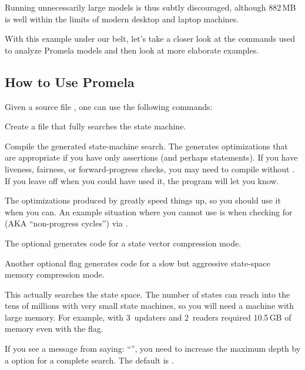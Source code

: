 Running unnecessarily large models is thus subtly discouraged, although
882\,MB is well within the limits of modern desktop and laptop machines.

With this example under our belt, let's take a closer look at the
commands used to analyze Promela models and then look at more
elaborate examples.

\subsection{How to Use Promela}
\label{sec:formal:How to Use Promela}

Given a source file , one can use the following commands:

\begin{description}[style=nextline]
\item	[\tco{spin -a qrcu.spin}]
	Create a file  that fully searches the state machine.
\item	[\tco{cc -DSAFETY [-DCOLLAPSE] [-DMA=N] -o pan pan.c}]
	Compile the generated state-machine search.
	The  generates optimizations that are appropriate
	if you have only assertions (and perhaps  statements).
	If you have liveness, fairness, or forward-progress checks,
	you may need to compile without .
	If you leave off  when you could have used it,
	the program will let you know.

	The optimizations produced by  greatly speed things
	up, so you should use it when you can.
	An example situation where you cannot use  is
	when checking for  (AKA ``non-progress cycles'')
	via .

	The optional  generates code for a state vector
	compression mode.

	Another optional flag  generates code for a slow
	but aggressive state-space memory compression mode.
\item	[\tco{./pan [-mN] [-wN]}]
	This actually searches the state space.
	The number of states can reach into the tens of millions with
	very small state machines, so you will need a machine with
	large memory.
	For example,  with 3~updaters and 2~readers required
	10.5\,GB of memory even with the  flag.

	If you see a message from  saying:
	``'', you need to increase
	the maximum depth by a  option for a complete search.
	The default is .


\end{description}
